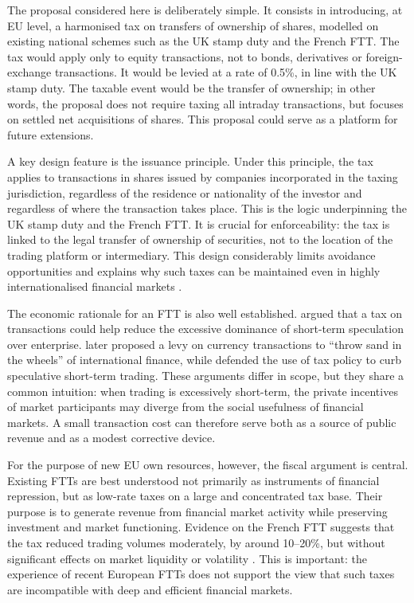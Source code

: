 \documentclass[../../main]{subfiles}
\begin{document}
The proposal considered here is deliberately simple. It consists in introducing, at EU level, a harmonised tax on transfers of ownership of shares, modelled on existing national schemes such as the UK stamp duty and the French FTT. The tax would apply only to equity transactions, not to bonds, derivatives or foreign-exchange transactions. It would be levied at a rate of 0.5\%, in line with the UK stamp duty. The taxable event would be the transfer of ownership; in other words, the proposal does not require taxing all intraday transactions, but focuses on settled net acquisitions of shares. This proposal could serve as a platform for future extensions.

A key design feature is the issuance principle. Under this principle, the tax applies to transactions in shares issued by companies incorporated in the taxing jurisdiction, regardless of the residence or nationality of the investor and regardless of where the transaction takes place. This is the logic underpinning the UK stamp duty and the French FTT. It is crucial for enforceability: the tax is linked to the legal transfer of ownership of securities, not to the location of the trading platform or intermediary. This design considerably limits avoidance opportunities and explains why such taxes can be maintained even in highly internationalised financial markets \citep{CapelleBlancardPersaud2025}.

The economic rationale for an FTT is also well established. \citet{Keynes1936} argued that a tax on transactions could help reduce the excessive dominance of short-term speculation over enterprise. \citet{Tobin1978} later proposed a levy on currency transactions to ``throw sand in the wheels'' of international finance, while \citet{Stiglitz1989} defended the use of tax policy to curb speculative short-term trading. These arguments differ in scope, but they share a common intuition: when trading is excessively short-term, the private incentives of market participants may diverge from the social usefulness of financial markets. A small transaction cost can therefore serve both as a source of public revenue and as a modest corrective device.

For the purpose of new EU own resources, however, the fiscal argument is central. Existing FTTs are best understood not primarily as instruments of financial repression, but as low-rate taxes on a large and concentrated tax base. Their purpose is to generate revenue from financial market activity while preserving investment and market functioning. Evidence on the French FTT suggests that the tax reduced trading volumes moderately, by around 10--20\%, but without significant effects on market liquidity or volatility \citep{ColliardHoffmann2017}. This is important: the experience of recent European FTTs does not support the view that such taxes are incompatible with deep and efficient financial markets.
\end{document}
